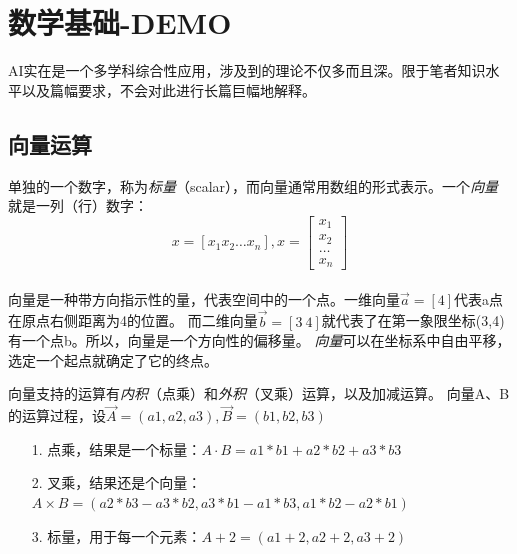 \chapter{数学基础-DEMO}
\label{chap:math_regression}

AI实在是一个多学科综合性应用，涉及到的理论不仅多而且深。限于笔者知识水平以及篇幅要求，不会对此进行长篇巨幅地解释。


\section{向量运算}
单独的一个数字，称为\emph{标量}（scalar），而向量通常用数组的形式表示。一个\emph{向量}就是一列（行）数字：
\begin{equation}
x=[x_1 x_2 \dots x_n],
x=\left[\begin{array}{c} x_1\\x_2\\\dots\\x_n\end{array}\right]
\label{part2_vector_form}
\end{equation}
\ \\
向量是一种带方向指示性的量，代表空间中的一个点。一维向量$\vec{a}=\left[4\right]$代表a点在原点右侧距离为4的位置。
而二维向量$\vec{b}=\left[3\ 4\right]$就代表了在第一象限坐标(3,4)有一个点b。所以，向量是一个方向性的偏移量。
\emph{向量}可以在坐标系中自由平移，选定一个起点就确定了它的终点。

\begin{center} \end{center} 

向量支持的运算有\emph{内积}（点乘）和\emph{外积}（叉乘）运算，以及加减运算。
向量A、B的运算过程，设$\vec{A} = (a1,  a2,  a3), \vec{B} = (b1,  b2,  b3)$

\begin{itemize}
\item[1.] 点乘，结果是一个标量：$A \cdot B = a1*b1 + a2*b2 + a3*b3$
\item[2.] 叉乘，结果还是个向量：$A \times B = (a2*b3 - a3*b2, a3*b1 - a1*b3, a1*b2 - a2*b1)$
\item[3.] 标量，用于每一个元素：$A + 2 = (a1+2, a2+2, a3+2)$
\end{itemize}

